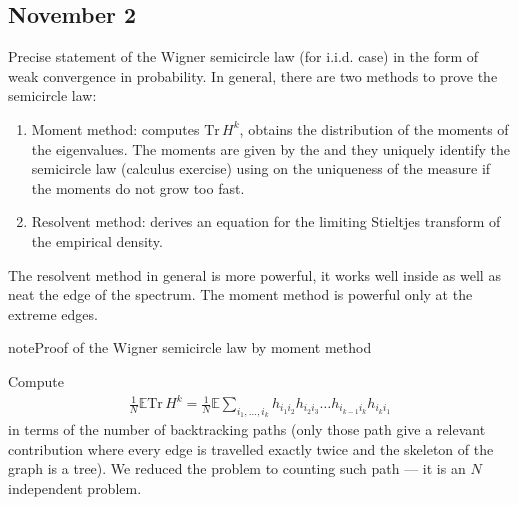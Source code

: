\documentclass[letterpaper,10pt,english]{sphinxhowto}
\begin{document}
\subsection{November 2}
\label{\detokenize{teaching/random_matrices_2017:november-2}}
\sphinxAtStartPar
Precise statement of the Wigner semicircle law (for i.i.d. case) in the form of weak convergence in probability. In general, there are two methods to prove the semicircle law:
\begin{enumerate}
%
\item {} 
\sphinxAtStartPar
Moment method: computes \(\text{Tr}\, H^k\), obtains the distribution of the moments of the eigenvalues. The moments are given by the  and they uniquely identify the semicircle law (calculus exercise) using  on the uniqueness of the measure if the moments do not grow too fast.

\item {} 
\sphinxAtStartPar
Resolvent method: derives an equation for the limiting Stieltjes transform of the empirical density.

\end{enumerate}

\sphinxAtStartPar
The resolvent method in general is more powerful, it works well inside as well as neat the edge of the spectrum. The moment method is powerful only at the extreme edges.

\begin{sphinxadmonition}{note}{Proof of the Wigner semicircle law by moment method}

\sphinxAtStartPar
Compute
\begin{equation*}
\begin{split}
\frac{1}{N} \mathbb E \text{Tr}\, H^k=\frac{1}{N}\mathbb E\sum_{i_1,\dots,i_k} h_{i_1i_2}h_{i_2i_3}\dots h_{i_{k-1}i_k}h_{i_ki_1}
\end{split}
\end{equation*}
\sphinxAtStartPar
in terms of the number of backtracking paths (only those path give a relevant contribution where every edge is travelled exactly twice and the skeleton of the graph is a tree). We reduced the problem to counting such path — it is an \(N\) independent problem.
\end{sphinxadmonition}
\end{document}
